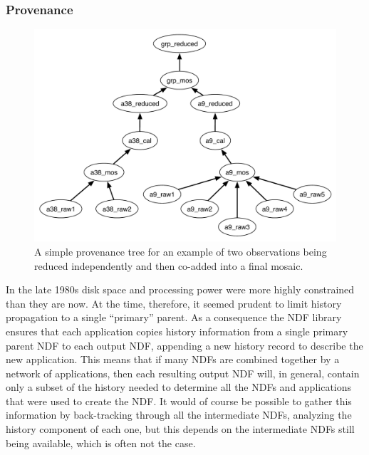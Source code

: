 \documentclass[final,authoryear,5p,times,twocolumn]{elsarticle}
\begin{document}
\subsubsection{Provenance}
\label{sec:provenance}

\begin{figure}
\includegraphics[width=\columnwidth]{provenance}
\caption{A simple provenance tree for an example of two observations
  being reduced independently and then co-added into a final
  mosaic.}
\label{fig:prov}
\end{figure}

In the late 1980s disk space and processing power were more highly
constrained than they are now. At the time, therefore, it
seemed prudent to limit history propagation to a single ``primary''
parent.  As a consequence the NDF library ensures that each application
copies history information from a single primary parent NDF to each
output NDF, appending a new history record to describe the new
application. This means that if many NDFs are combined together by a
network of applications, then each resulting output NDF will, in
general, contain only a subset of the history needed to determine all
the NDFs and applications that were used to create the NDF. It would
of course be possible to gather this information by back-tracking
through all the intermediate NDFs, analyzing the history component of
each one, but this depends on the intermediate NDFs still being
available, which is often not the case.
\end{document}

